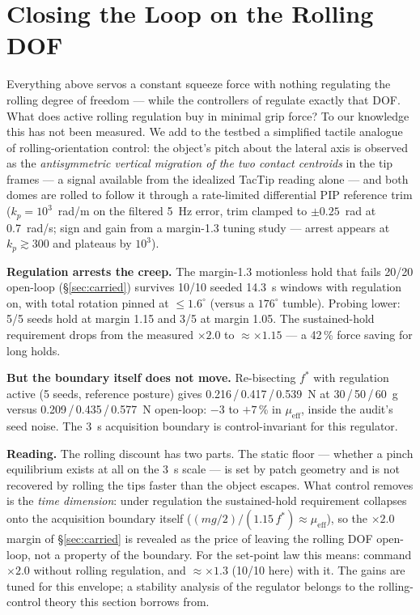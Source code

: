 \documentclass[journal]{IEEEtran}
\newcommand{\mueff}{\mu_{\mathrm{eff}}}
\newcommand{\fstar}{f^{*}}
\begin{document}
\section{Closing the Loop on the Rolling DOF}
\label{sec:closedloop}

Everything above servos a constant squeeze force with nothing regulating
the rolling degree of freedom --- while the controllers of
\cite{psomopoulou2018stable,psomopoulou2021pinching} regulate exactly that
DOF. What does active rolling regulation buy in minimal grip force? To
our knowledge this has not been measured. We add to the testbed a
simplified tactile analogue of rolling-orientation control: the object's
pitch about the lateral axis is observed as the \emph{antisymmetric
vertical migration of the two contact centroids} in the tip frames ---
a signal available from the idealized TacTip reading alone --- and both
domes are rolled to follow it through a rate-limited differential PIP
reference trim ($k_p = 10^3$~rad/m on the filtered 5~Hz error, trim
clamped to $\pm 0.25$~rad at 0.7~rad/s; sign and gain from a margin-1.3
tuning study --- arrest appears at $k_p \gtrsim 300$ and plateaus by
$10^3$).

\textbf{Regulation arrests the creep.} The margin-1.3 motionless hold
that fails 20/20 open-loop (\S\ref{sec:carried}) survives 10/10 seeded
14.3~s windows with regulation on, with total rotation pinned at
$\le 1.6^\circ$ (versus a $176^\circ$ tumble). Probing lower: 5/5 seeds
hold at margin 1.15 and 3/5 at margin 1.05. The sustained-hold
requirement drops from the measured $\times 2.0$ to
${\approx}\times 1.15$ --- a 42\,\% force saving for long holds.

\textbf{But the boundary itself does not move.} Re-bisecting $\fstar$
with regulation active (5 seeds, reference posture) gives
0.216\,/\,0.417\,/\,0.539~N at 30\,/\,50\,/\,60~g versus
0.209\,/\,0.435\,/\,0.577~N open-loop: $-3$ to $+7$\,\% in $\mueff$,
inside the audit's seed noise. The 3~s acquisition boundary is
control-invariant for this regulator.

\textbf{Reading.} The rolling discount has two parts. The static floor
--- whether a pinch equilibrium exists at all on the 3~s scale --- is
set by patch geometry and is not recovered by rolling the tips faster
than the object escapes. What control removes is the \emph{time
dimension}: under regulation the sustained-hold requirement collapses
onto the acquisition boundary itself
($(mg/2)/(1.15\,\fstar) \approx \mueff$), so the $\times 2.0$ margin of
\S\ref{sec:carried} is revealed as the price of leaving the rolling DOF
open-loop, not a property of the boundary. For the set-point law this
means: command $\times 2.0$ without rolling regulation, and
${\approx}\times 1.3$ (10/10 here) with it. The gains are tuned for this
envelope; a stability analysis of the regulator belongs to the
rolling-control theory this section borrows from.
\end{document}
